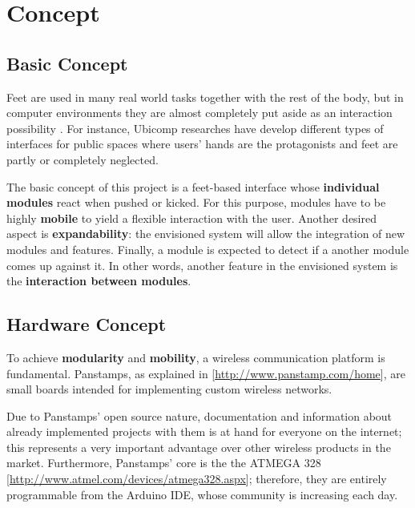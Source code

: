 \section{Concept}
\subsection{Basic Concept}
Feet are used in many real world tasks together with the rest of the body, but in computer environments they are almost completely put aside as an interaction possibility \cite{pakkanen}. For instance, Ubicomp researches have develop different types of interfaces for public spaces where users' hands are the protagonists and feet are partly or completely neglected. 

The basic concept of this project is a feet-based interface whose \textbf{individual modules} react when pushed or kicked. For this purpose, modules have to be highly \textbf {mobile} to yield a flexible interaction with the user. Another desired aspect is \textbf {expandability}: the envisioned system will allow the integration of new modules and features. %
Finally, a module is expected to detect if a another module comes up against it. In other words, another feature in the envisioned system is the \textbf{interaction between modules}. 


\subsection{Hardware Concept}
To achieve \textbf{modularity} and \textbf{mobility}, a wireless communication platform is fundamental.   
Panstamps, as explained in [{\url{http://www.panstamp.com/home}}], are small boards intended for implementing custom wireless networks.

Due to Panstamps' open source nature, documentation and information about already implemented projects with them is at hand for everyone on the internet; this represents a very important advantage over other wireless products in the market. %
Furthermore, Panstamps' core is the the ATMEGA 328 [{\url{http://www.atmel.com/devices/atmega328.aspx}}]; therefore, they are entirely programmable from the Arduino IDE, whose community is increasing each day.%

